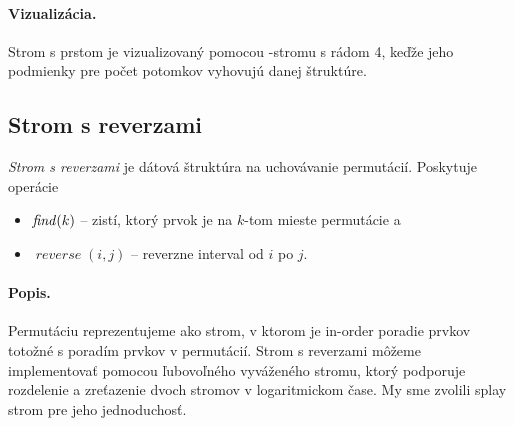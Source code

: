 
\paragraph{Vizualizácia.}
Strom s prstom je vizualizovaný pomocou \Bp-stromu s rádom 4, keďže jeho podmienky pre počet potomkov vyhovujú
danej štruktúre.

\subsection{Strom s reverzami}
\emph{Strom s reverzami} je dátová štruktúra na uchovávanie permutácií.
Poskytuje operácie
\begin{itemize}
\item $\mathop{\mathit{find}}(k)$ -- zistí, ktorý prvok je na $k$-tom mieste permutácie a
\item $\mathop{\mathit{reverse}}(i,j)$ -- reverzne interval od $i$ po $j$.
\end{itemize}

\paragraph{Popis.}
Permutáciu reprezentujeme ako strom, v ktorom je in-order poradie prvkov totožné
s poradím prvkov v permutácií. Strom s reverzami môžeme implementovať pomocou ľubovoľného
vyváženého stromu, ktorý podporuje rozdelenie a zreťazenie dvoch stromov v logaritmickom čase.
My sme zvolili splay strom pre jeho jednoduchosť.

